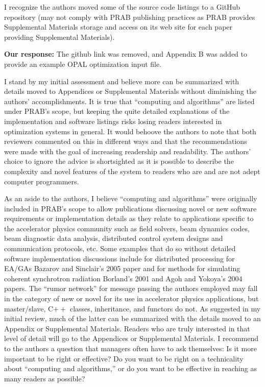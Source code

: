 \documentclass{article}
\begin{document}
I recognize the authors moved some of the source code listings to a
GitHub repository (may not comply with PRAB publishing practices as
PRAB provides Supplemental Materials storage and access on its web
site for each paper providing Supplemental Materials). 

{\bf Our response:} {\color{blue} The github link was removed,
	and Appendix B was added to provide an example OPAL 
	optimization input file.}




I stand by my
initial assessment and believe more can be summarized with details
moved to Appendices or Supplemental Materials without diminishing the
authors' accomplishments. It is true that ``computing and algorithms''
are listed under PRAB's scope, but keeping the quite detailed
explanations of the implementation and software listings risks losing
readers interested in optimization systems in general. It would
behoove the authors to note that both reviewers commented on this in
different ways and that the recommendations were made with the goal of
increasing readership and readability. The authors' choice to ignore
the advice is shortsighted as it is possible to describe the
complexity and novel features of the system to readers who are and are
not adept computer programmers.

As an aside to the authors, I believe ``computing and algorithms''
were originally included in PRAB's scope to allow publications
discussing novel or new software requirements or
implementation details as they relate to applications specific to the
accelerator physics community such as field solvers, beam dynamics
codes, beam diagnostic data analysis, distributed control system
designs and communication protocols, etc. Some examples that do so
without detailed software implementation discussions include for
distributed processing for EA/GAs Bazarov and Sinclair's 2005 paper
and for methods for simulating coherent synchrotron radiation
Borland's 2001 and Agoh and Yokoya's 2004 papers. The ``rumor
network'' for message passing the authors employed may fall in the
category of new or novel for its use in accelerator physics
applications, but master/slave, C$++$ classes, inheritance, and
functors do not. As suggested in my initial review, much of the latter
can be summarized with the details moved to an Appendix or
Supplemental Materials. Readers who are truly interested in that level
of detail will go to the Appendices or Supplemental Materials. I
recommend to the authors a question that managers often have to ask
themselves: Is it more important to be right or effective? Do you want
to be right on a technicality about ``computing and algorithms,'' or
do you want to be effective in reaching as many readers as possible?
\end{document}

